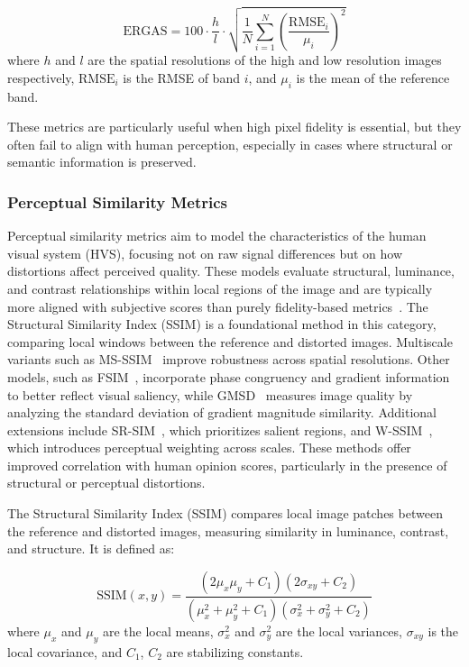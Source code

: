 \begin{equation}
\text{ERGAS} = 100 \cdot \frac{h}{l} \cdot \sqrt{ \frac{1}{N} \sum_{i=1}^{N} {\left( \frac{\text{RMSE}_i}{\mu_i} \right)}^2 }
\end{equation}
where $h$ and $l$ are the spatial resolutions of the high and low resolution images respectively, $\text{RMSE}_i$ is the RMSE of band $i$, and $\mu_i$ is the mean of the reference band.

These metrics are particularly useful when high pixel fidelity is essential, but they often fail to align with human perception, especially in cases where structural or semantic information is preserved.


\subsubsection{Perceptual Similarity Metrics}\label{sec:perceptual_metrics}

Perceptual similarity metrics aim to model the characteristics of the human visual system (HVS), focusing not on raw signal differences but on how distortions affect perceived quality. These models evaluate structural, luminance, and contrast relationships within local regions of the image and are typically more aligned with subjective scores than purely fidelity-based metrics~\cite{wang2004image,chandler2007vsnr}. The Structural Similarity Index (SSIM) is a foundational method in this category, comparing local windows between the reference and distorted images. Multiscale variants such as MS-SSIM~\cite{Wang2003MSSSIM} improve robustness across spatial resolutions. Other models, such as FSIM~\cite{Zhang2011FSIM}, incorporate phase congruency and gradient information to better reflect visual saliency, while GMSD~\cite{Xue2014GMSD} measures image quality by analyzing the standard deviation of gradient magnitude similarity. Additional extensions include SR-SIM~\cite{Zhang2012SRSIM}, which prioritizes salient regions, and W-SSIM~\cite{Engelke2011WSSIM}, which introduces perceptual weighting across scales. These methods offer improved correlation with human opinion scores, particularly in the presence of structural or perceptual distortions.

The Structural Similarity Index (SSIM) compares local image patches between the reference and distorted images, measuring similarity in luminance, contrast, and structure. It is defined as:

\begin{equation}
\text{SSIM}(x, y) = \frac{(2\mu_x \mu_y + C_1)(2\sigma_{xy} + C_2)}{(\mu_x^2 + \mu_y^2 + C_1)(\sigma_x^2 + \sigma_y^2 + C_2)}
\end{equation}
where $\mu_x$ and $\mu_y$ are the local means, $\sigma_x^2$ and $\sigma_y^2$ are the local variances, $\sigma_{xy}$ is the local covariance, and $C_1$, $C_2$ are stabilizing constants.

